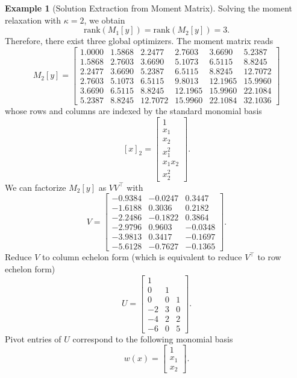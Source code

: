 \documentclass[
]{book}
\theoremstyle{definition}
\theoremstyle{definition}
\newtheorem{example}{Example}[chapter]
\theoremstyle{definition}
\theoremstyle{definition}
\theoremstyle{remark}
\begin{document}
\begin{example}[Solution Extraction from Moment Matrix]
Solving the moment relaxation with \(\kappa =2\), we obtain
\[
\mathrm{rank}(M_1[y]) = \mathrm{rank}(M_2[y]) = 3.
\]
Therefore, there exist three global optimizers. The moment matrix reads
\[
M_2[y] = \begin{bmatrix}
1.0000 & 1.5868 & 2.2477 & 2.7603 & 3.6690 & 5.2387 \\
1.5868 & 2.7603 & 3.6690 & 5.1073 & 6.5115 & 8.8245 \\
2.2477 & 3.6690 & 5.2387 & 6.5115 & 8.8245 & 12.7072 \\
2.7603 & 5.1073 & 6.5115 & 9.8013 & 12.1965 & 15.9960 \\
3.6690 & 6.5115 & 8.8245 & 12.1965 & 15.9960 & 22.1084 \\
5.2387 & 8.8245 & 12.7072 & 15.9960 & 22.1084 & 32.1036
\end{bmatrix}
\]
whose rows and columns are indexed by the standard monomial basis
\[
[x]_2 = \begin{bmatrix}
1 \\ x_1 \\ x_2 \\ x_1^2 \\ x_1 x_2 \\ x_2^2 
\end{bmatrix}.
\]
We can factorize \(M_2[y]\) as \(VV^\top\) with
\[
V = \begin{bmatrix}
-0.9384 & - 0.0247 & 0.3447 \\
-1.6188 & 0.3036 & 0.2182 \\
-2.2486 & -0.1822 & 0.3864 \\
-2.9796 & 0.9603 & -0.0348 \\
-3.9813 & 0.3417 & -0.1697 \\
-5.6128 & -0.7627 & -0.1365
\end{bmatrix}.
\]
Reduce \(V\) to column echelon form (which is equivalent to reduce \(V^\top\) to row echelon form)
\[
U = \begin{bmatrix}
1 & & \\
0 & 1 & \\
0 & 0 & 1 \\
-2 & 3 & 0 \\
-4 & 2 & 2 \\
-6 & 0 & 5 
\end{bmatrix}.
\]
Pivot entries of \(U\) correspond to the following monomial basis
\[
w(x) = \begin{bmatrix} 1\\ x_1 \\ x_2 \end{bmatrix}.
\]
\end{example}
\end{document}
